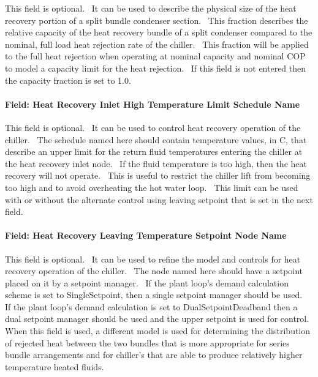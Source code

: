 This field is optional.~ It can be used to describe the physical size of the heat recovery portion of a split bundle condenser section.~ This fraction describes the relative capacity of the heat recovery bundle of a split condenser compared to the nominal, full load heat rejection rate of the chiller.~ This fraction will be applied to the full heat rejection when operating at nominal capacity and nominal COP to model a capacity limit for the heat rejection.~ If this field is not entered then the capacity fraction is set to 1.0.

\paragraph{Field: Heat Recovery Inlet High Temperature Limit Schedule Name}\label{field-heat-recovery-inlet-high-temperature-limit-schedule-name}

This field is optional.~ It can be used to control heat recovery operation of the chiller.~ The schedule named here should contain temperature values, in C, that describe an upper limit for the return fluid temperatures entering the chiller at the heat recovery inlet node.~ If the fluid temperature is too high, then the heat recovery will not operate.~ This is useful to restrict the chiller lift from becoming too high and to avoid overheating the hot water loop.~ This limit can be used with or without the alternate control using leaving setpoint that is set in the next field.

\paragraph{Field: Heat Recovery Leaving Temperature Setpoint Node Name}\label{field-heat-recovery-leaving-temperature-setpoint-node-name}

This field is optional.~ It can be used to refine the model and controls for heat recovery operation of the chiller.~ The node named here should have a setpoint placed on it by a setpoint manager.~ If the plant loop's demand calculation scheme is set to SingleSetpoint, then a single setpoint manager should be used.~ If the plant loop's demand calculation is set to DualSetpointDeadband then a dual setpoint manager should be used and the upper setpoint is used for control.~ When this field is used, a different model is used for determining the distribution of rejected heat between the two bundles that is more appropriate for series bundle arrangements and for chiller's that are able to produce relatively higher temperature heated fluids.

